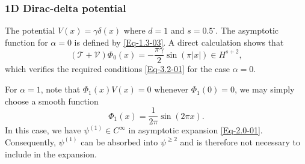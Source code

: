 \documentclass{sn-jnl}%
\newcommand{\m}{\textbf{-}}
\numberwithin{equation}{section}
\theoremstyle{thmstyleone}%
\theoremstyle{thmstyletwo}%
\theoremstyle{thmstylethree}%
\begin{document}
\subsubsection*{1D Dirac-delta potential} The potential $V(x) = \gamma\delta(x)$ where $d=1$ and $s=0.5^{\m}$. 
The asymptotic function for $\alpha=0$ is defined by \eqref{Eq-1.3-03}. 
A direct calculation shows that
\begin{equation}
    (\mathcal{T}+\mathcal{V})\Phi_{0}(x) =-\frac{\pi\gamma}{2}\sin(\pi |x|)\in H^{s+2},
\end{equation}
which verifies the required conditions \eqref{Eq-3.2-01} for the case $\alpha=0$.

For  $\alpha=1$, note that $\Phi_1(x)V(x)=0$  whenever $\Phi_1(0)=0$, we may simply choose a smooth function
\begin{equation}
    \Phi_{1} (x) = \frac{1}{2\pi}\sin (2\pi x).
\end{equation}
 In this case, we have $\psi^{(1)}\in C^{\infty}$ in asymptotic expansion \eqref{Eq-2.0-01}. Consequently, $\psi^{(1)}$ can be absorbed into $\psi^{\geq 2}$ and is therefore not necessary to include in the expansion.
\end{document}

